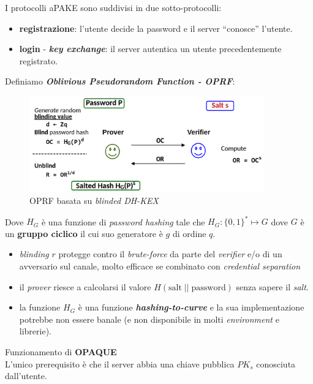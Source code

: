 \begin{flushleft}
    I protocolli aPAKE sono suddivisi in due sotto-protocolli:
    \begin{itemize}[nosep]
        \item \textbf{registrazione}: l'utente decide la password e il server ``conosce'' l'utente.
        \item \textbf{login} - \textbf{\textit{key exchange}}: il server autentica un utente precedentemente registrato.
    \end{itemize}

    Definiamo \textbf{\textit{Oblivious Pseudorandom Function - OPRF}}:

    \begin{figure}[h]
        \centering
        \includegraphics[width=0.9\textwidth]{img/oprf.png}
        \caption{OPRF basata su \textit{blinded DH-KEX}}
    \end{figure}

    Dove $H_G$ è una funzione di \textit{password hashing} tale che $H_G : \{0, 1\}^* \mapsto G$ dove $G$ è un \textbf{gruppo ciclico} il cui suo generatore è $g$ di ordine $q$.
    \begin{itemize}[nosep]
        \item \textit{blinding} $r$ protegge contro il \textit{brute-force} da parte del \textit{verifier} e/o di un avversario sul canale, molto efficace se combinato con \textit{credential separation}
        \item il \textit{prover} riesce a calcolarsi il valore $H(\text{salt} \; || \; \text{password})$ senza sapere il \textit{salt}.
        \item la funzione $H_G$ è una funzione \textbf{\textit{hashing-to-curve}} e la sua implementazione potrebbe non essere banale (e non disponibile in molti \textit{environment} e librerie).
    \end{itemize}

    \newpage

    Funzionamento di \textbf{OPAQUE} \\
    L'unico prerequisito è che il server abbia una chiave pubblica $PK_s$ conosciuta dall'utente.
    

\end{flushleft}
